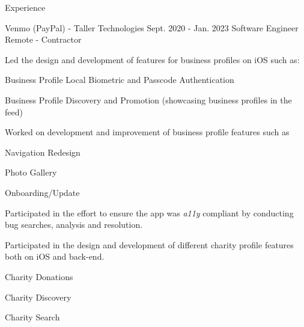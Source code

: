\documentclass{curriculum}
\begin{document}
\begin{cvsection}{Experience}


    \makesectionitemheader
        {Venmo (PayPal) - Taller Technologies}              {Sept. 2020 - Jan. 2023}
        {Software Engineer}                                 {Remote - Contractor}

        \begin{sectionitemlist}

        \item{
            Led the design and development of features for business profiles on iOS such as:
        }{
            \begin{colsectionitemlist}{2}
            \item{Business Profile Local Biometric and Passcode Authentication}
            \item{Business Profile Discovery and Promotion (showcasing business profiles in the feed)}
            \end{colsectionitemlist}
        }

        \item{
            Worked on development and improvement of business profile features such as
        }{
            \begin{colsectionitemlist}{2}
            \item{Navigation Redesign}
            \item{Photo Gallery}
            \item{Onboarding/Update}
            \end{colsectionitemlist}
        }

        \item{
            Participated in the effort to ensure the app was \textit{a11y} compliant
            by conducting bug searches, analysis and resolution.
        }

        \item{
            Participated in the design and development of
            different charity profile features both on iOS and back-end.
        }{
            \begin{colsectionitemlist}{3}
            \item{Charity Donations}
            \item{Charity Discovery}
            \item{Charity Search}
            \end{colsectionitemlist}
        }


\end{sectionitemlist}
\end{cvsection}
\end{document}
